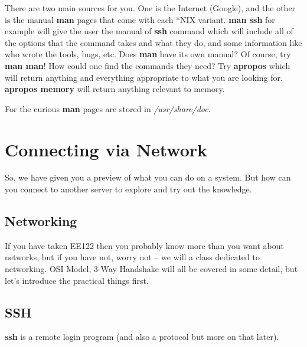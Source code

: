 \documentclass[10pt]{article}
\begin{document}
There are two main sources for you. One is the Internet (Google), and the other is the manual {\bf man} pages that come with each *NIX variant. {\bf man ssh} for example will give the user the manual of {\bf ssh} command which will include all of the options that the command takes and what they do, and some information like who wrote the tools, bugs, etc. Does {\bf man} have its own manual? Of course, try {\bf man man}! How could one find the commands they need? Try {\bf apropos} which will return anything and everything appropriate to what you are looking for. {\bf apropos memory} will return anything relevant to memory.

For the curious {\bf man} pages are stored in \emph{/usr/share/doc}.


\section{Connecting via Network}
So, we have given you a preview of what you can do on a system. But how can you connect to another server to explore and try out the knowledge. 
\subsection{Networking}
If you have taken EE122 then you probably know more than you want about networks, but if you have not, worry not -- we will a class dedicated to networking. OSI Model, 3-Way Handshake will all be covered in some detail, but let's introduce the practical things first.
\subsection{SSH} 
{\bf ssh} is a remote login program (and also a protocol but more on that later).
\end{document}
